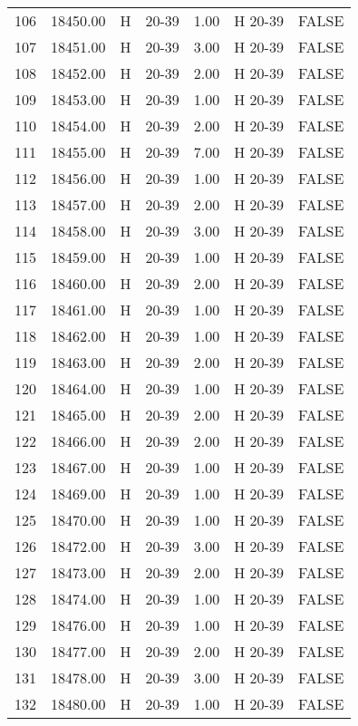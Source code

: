 \begin{table}[ht]
\begin{tabular}{rrllrll}
  106 & 18450.00 & H & 20-39 & 1.00 & H 20-39 & FALSE \\ 
  107 & 18451.00 & H & 20-39 & 3.00 & H 20-39 & FALSE \\ 
  108 & 18452.00 & H & 20-39 & 2.00 & H 20-39 & FALSE \\ 
  109 & 18453.00 & H & 20-39 & 1.00 & H 20-39 & FALSE \\ 
  110 & 18454.00 & H & 20-39 & 2.00 & H 20-39 & FALSE \\ 
  111 & 18455.00 & H & 20-39 & 7.00 & H 20-39 & FALSE \\ 
  112 & 18456.00 & H & 20-39 & 1.00 & H 20-39 & FALSE \\ 
  113 & 18457.00 & H & 20-39 & 2.00 & H 20-39 & FALSE \\ 
  114 & 18458.00 & H & 20-39 & 3.00 & H 20-39 & FALSE \\ 
  115 & 18459.00 & H & 20-39 & 1.00 & H 20-39 & FALSE \\ 
  116 & 18460.00 & H & 20-39 & 2.00 & H 20-39 & FALSE \\ 
  117 & 18461.00 & H & 20-39 & 1.00 & H 20-39 & FALSE \\ 
  118 & 18462.00 & H & 20-39 & 1.00 & H 20-39 & FALSE \\ 
  119 & 18463.00 & H & 20-39 & 2.00 & H 20-39 & FALSE \\ 
  120 & 18464.00 & H & 20-39 & 1.00 & H 20-39 & FALSE \\ 
  121 & 18465.00 & H & 20-39 & 2.00 & H 20-39 & FALSE \\ 
  122 & 18466.00 & H & 20-39 & 2.00 & H 20-39 & FALSE \\ 
  123 & 18467.00 & H & 20-39 & 1.00 & H 20-39 & FALSE \\ 
  124 & 18469.00 & H & 20-39 & 1.00 & H 20-39 & FALSE \\ 
  125 & 18470.00 & H & 20-39 & 1.00 & H 20-39 & FALSE \\ 
  126 & 18472.00 & H & 20-39 & 3.00 & H 20-39 & FALSE \\ 
  127 & 18473.00 & H & 20-39 & 2.00 & H 20-39 & FALSE \\ 
  128 & 18474.00 & H & 20-39 & 1.00 & H 20-39 & FALSE \\ 
  129 & 18476.00 & H & 20-39 & 1.00 & H 20-39 & FALSE \\ 
  130 & 18477.00 & H & 20-39 & 2.00 & H 20-39 & FALSE \\ 
  131 & 18478.00 & H & 20-39 & 3.00 & H 20-39 & FALSE \\ 
  132 & 18480.00 & H & 20-39 & 1.00 & H 20-39 & FALSE \\ 

\end{tabular}
\end{table}
